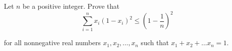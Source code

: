 Let $n$ be a positive integer. Prove that\[\sum_{i=1}^nx_i(1-x_i)^2\le\left(1-\frac{1}{n}\right)^2 \]

for all nonnegative real numbers $x_1,x_2,\ldots ,x_n$ such that $x_1+x_2+\ldots x_n=1$.